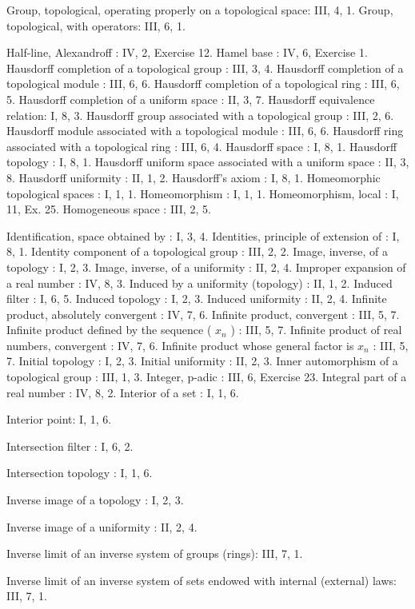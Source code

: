 Group, topological, operating properly on a topological space: III, 4, 1. Group, topological, with operators: III, 6, 1.

Half-line, Alexandroff : IV, 2, Exercise 12. Hamel base : IV, 6, Exercise 1. Hausdorff completion of a topological group : III, 3, 4. Hausdorff completion of a topological module : III, 6, 6. Hausdorff completion of a topological ring : III, 6, 5. Hausdorff completion of a uniform space : II, 3, 7. Hausdorff equivalence relation: I, 8, 3. Hausdorff group associated with a topological group : III, 2, 6. Hausdorff module associated with a topological module : III, 6, 6. Hausdorff ring associated with a topological ring : III, 6, 4. Hausdorff space : I, 8, 1. Hausdorff topology : I, 8, 1. Hausdorff uniform space associated with a uniform space : II, 3, 8. Hausdorff uniformity : II, 1, 2. Hausdorff's axiom : I, 8, 1. Homeomorphic topological spaces : I, 1, 1. Homeomorphism : I, 1, 1. Homeomorphism, local : I, 11, Ex. 25. Homogeneous space : III, 2, 5.

Identification, space obtained by : I, 3, 4. Identities, principle of extension of : I, 8, 1. Identity component of a topological group : III, 2, 2. Image, inverse, of a topology : I, 2, 3. Image, inverse, of a uniformity : II, 2, 4. Improper expansion of a real number : IV, 8, 3. Induced by a uniformity (topology) : II, 1, 2. Induced filter : I, 6, 5. Induced topology : I, 2, 3. Induced uniformity : II, 2, 4. Infinite product, absolutely convergent : IV, 7, 6. Infinite product, convergent : III, 5, 7. Infinite product defined by the sequence ( \(x_n\) ) : III, 5, 7. Infinite product of real numbers, convergent : IV, 7, 6. Infinite product whose general factor is \(x_n\) : III, 5, 7. Initial topology : I, 2, 3. Initial uniformity : II, 2, 3. Inner automorphism of a topological group : III, 1, 3. Integer, p-adic : III, 6, Exercise 23. Integral part of a real number : IV, 8, 2. Interior of a set : I, 1, 6.

Interior point: I, 1, 6.

Intersection filter : I, 6, 2.

Intersection topology : I, 1, 6.

Inverse image of a topology : I, 2, 3.

Inverse image of a uniformity : II, 2, 4.

Inverse limit of an inverse system of groups (rings): III, 7, 1.

Inverse limit of an inverse system of sets endowed with internal (external) laws: III, 7, 1.

